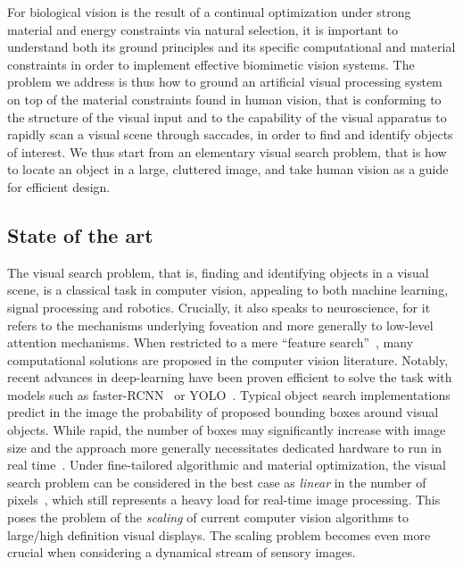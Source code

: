 For biological vision is the result of a continual optimization under strong material and energy constraints via natural selection, it is important to understand both its ground principles and its specific computational and material constraints in order to implement effective biomimetic vision systems.
The problem we address is thus how to ground an artificial visual processing system on top of
the material constraints found in human vision, that is conforming to the structure of the visual input and to the capability of the visual apparatus to rapidly scan a visual scene through saccades, in order to find and identify objects of interest. We thus start from an elementary visual search problem, that is how to locate an object in a large, cluttered image, and take human vision as a guide for efficient design.

%
\subsection{State of the art}

The visual search problem, that is, finding and identifying objects in a visual scene, is a classical task in computer vision, appealing to both
machine learning, signal processing and robotics. Crucially, it also speaks to neuroscience, for it refers to the mechanisms underlying foveation and more generally to low-level attention mechanisms.
When restricted to a mere ``feature search''~\cite{Treisman80}, many computational solutions are proposed in the computer vision literature. Notably, recent advances in deep-learning have been proven efficient to solve the task with models such as faster-RCNN~\cite{Ren17} or YOLO~\cite{Redmon16}. %
Typical object search implementations predict in the image the probability of proposed bounding boxes around visual objects. While rapid, the number of boxes may significantly increase with image size and the approach more generally necessitates dedicated hardware to run in real time~\cite{feng2019computer}. Under fine-tailored algorithmic and material optimization, the visual search problem can be considered in the best case as \emph{linear} in the number of pixels~\cite{strengert2006pyramid}, which still represents a heavy load for real-time image processing. This poses the problem of the \emph{scaling} of current computer vision algorithms to large/high definition visual displays. The scaling problem becomes even more crucial when considering a dynamical stream of sensory images. %

